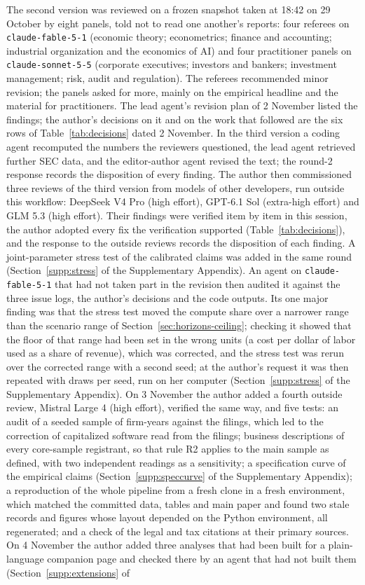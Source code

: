 The second version was reviewed on a frozen snapshot taken at 18:42 on 29 October by eight panels, told not to read one another's reports: four referees on \texttt{claude-fable-5-1} (economic theory; econometrics; finance and accounting; industrial organization and the economics of AI) and four practitioner panels on \texttt{claude-sonnet-5-5} (corporate executives; investors and bankers; investment management; risk, audit and regulation). The referees recommended minor revision; the panels asked for more, mainly on the empirical headline and the material for practitioners. The lead agent's revision plan of 2 November listed the findings; the author's decisions on it and on the work that followed are the six rows of Table~\ref{tab:decisions} dated 2 November. In the third version a coding agent recomputed the numbers the reviewers questioned, the lead agent retrieved further SEC data, and the editor-author agent revised the text; the round-2 response records the disposition of every finding. The author then commissioned three reviews of the third version from models of other developers, run outside this workflow: DeepSeek V4 Pro (high effort), GPT-6.1 Sol (extra-high effort) and GLM 5.3 (high effort). Their findings were verified item by item in this session, the author adopted every fix the verification supported (Table~\ref{tab:decisions}), and the response to the outside reviews records the disposition of each finding. A joint-parameter stress test of the calibrated claims was added in the same round (Section~\ref{supp:stress} of the Supplementary Appendix). An agent on \texttt{claude-fable-5-1} that had not taken part in the revision then audited it against the three issue logs, the author's decisions and the code outputs. Its one major finding was that the stress test moved the compute share over a narrower range than the scenario range of Section~\ref{sec:horizons-ceiling}; checking it showed that the floor of that range had been set in the wrong units (a cost per dollar of labor used as a share of revenue), which was corrected, and the stress test was rerun over the corrected range with a second seed; at the author's request it was then repeated with \StDraws{} draws per seed, run on her computer (Section~\ref{supp:stress} of the Supplementary Appendix). On 3 November the author added a fourth outside review, Mistral Large 4 (high effort), verified the same way, and five tests: an audit of a seeded sample of firm-years against the filings, which led to the correction of capitalized software read from the filings; business descriptions of every core-sample registrant, so that rule R2 applies to the main sample as defined, with two independent readings as a sensitivity; a specification curve of the empirical claims (Section~\ref{supp:speccurve} of the Supplementary Appendix); a reproduction of the whole pipeline from a fresh clone in a fresh environment, which matched the committed data, tables and main paper and found two stale records and figures whose layout depended on the Python environment, all regenerated; and a check of the legal and tax citations at their primary sources. On 4 November the author added three analyses that had been built for a plain-language companion page and checked there by an agent that had not built them (Section~\ref{supp:extensions} of 